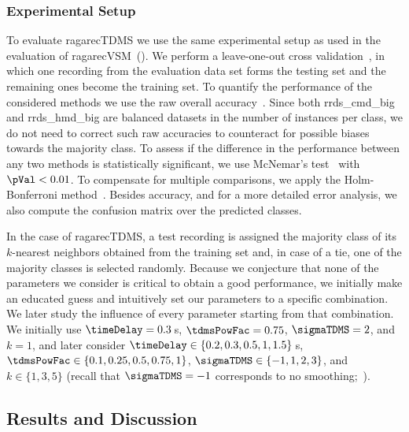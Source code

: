 \subsubsection{Experimental Setup}
\label{sec:tdms_experimental_setup}

To evaluate \acrshort{ragarecTDMS} we use the same experimental setup as used in the evaluation of \acrshort{ragarecVSM}~(). We perform a leave-one-out cross validation~\citep{Mitchell97BOOK}, in which one recording from the evaluation data set forms the testing set and the remaining ones become the training set. To quantify the performance of the considered methods we use the raw overall accuracy~\citep{Mitchell97BOOK}. Since both \acrshort{rrds_cmd_big} and \acrshort{rrds_hmd_big} are balanced datasets in the number of instances per class, we do not need to correct such raw accuracies to counteract for possible biases towards the majority class. To assess if the difference in the performance between any two methods is statistically significant, we use McNemar's test~\citep{mcnemar1947note} with $\pVal < 0.01$. To compensate for multiple comparisons, we apply the Holm-Bonferroni method~\citep{holm1979simple}. Besides accuracy, and for a more detailed error analysis, we also compute the confusion matrix over the predicted classes.

In the case of \acrshort{ragarecTDMS}, a test recording is assigned the majority class of its $k$-nearest neighbors obtained from the training set and, in case of a tie, one of the majority classes is selected randomly. Because we conjecture that none of the parameters we consider is critical to obtain a good performance, we initially make an educated guess and intuitively set our parameters to a specific combination. We later study the influence of every parameter starting from that combination. We initially use $\timeDelay=0.3$\,s, $\tdmsPowFac=0.75$, $\sigmaTDMS=2$, and $k=1$, and later consider $\timeDelay\in\lbrace 0.2, 0.3, 0.5, 1, 1.5\rbrace$\,s, $\tdmsPowFac\in\lbrace 0.1, 0.25, 0.5, 0.75, 1 \rbrace$, $\sigmaTDMS\in\lbrace -1, 1, 2, 3\rbrace$, and $k\in\lbrace 1,3,5\rbrace$ (recall that $\sigmaTDMS=-1$ corresponds to no smoothing;~).



\subsection{Results and Discussion}
\label{sec:tdms_results_and_discussion}

